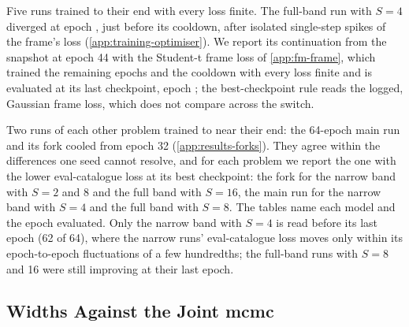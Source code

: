 Five runs trained to their end with every loss finite. The full-band run with $S=4$ diverged at
epoch \ResultsFullFourDivergedEpoch, just before its cooldown, after isolated single-step spikes of
the frame's loss (\cref{app:training-optimiser}). We report its continuation from the snapshot at
epoch 44 with the Student-t frame loss of \cref{app:fm-frame}, which trained the remaining epochs and
the cooldown with every loss finite and is evaluated at its last checkpoint, epoch \ResultsEpochs;
the best-checkpoint rule reads the logged, Gaussian frame loss, which does not compare across the
switch.

Two runs of each other problem trained to near their end: the 64-epoch main run and its fork cooled
from epoch 32 (\cref{app:results-forks}). They agree within the differences one seed cannot resolve,
and for each problem we report the one with the lower eval-catalogue loss at its best checkpoint:
the fork for the narrow band with $S=2$ and 8 and the full band with $S=16$, the main run for the
narrow band with $S=4$ and the full band with $S=8$. The tables name each model and the epoch
evaluated. Only the narrow band with $S=4$ is read before its last epoch (62 of 64), where the
narrow runs' eval-catalogue loss moves only within its epoch-to-epoch fluctuations of a few
hundredths; the full-band runs with $S=8$ and 16 were still improving at their last epoch.

\subsection{Widths Against the Joint \acs{mcmc}}
\label{app:results-mcmc}

